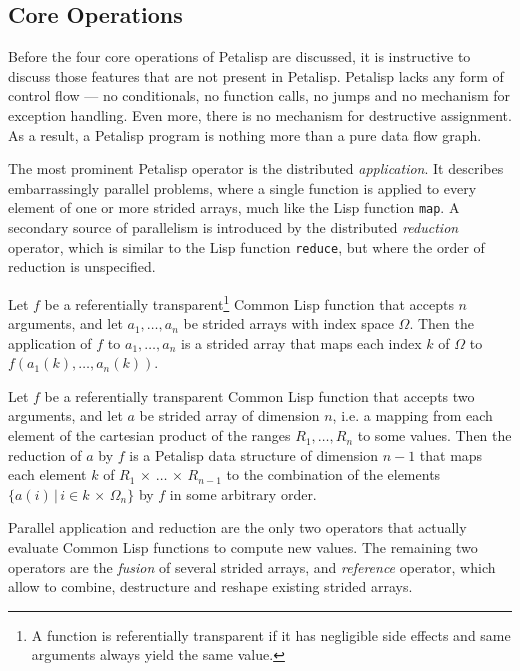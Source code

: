 \subsection{Core Operations}

Before the four core operations of Petalisp are discussed, it is
instructive to discuss those features that are not present in
Petalisp. Petalisp lacks any form of control flow --- no conditionals, no
function calls, no jumps and no mechanism for exception handling. Even
more, there is no mechanism for destructive assignment. As a result, a
Petalisp program is nothing more than a pure data flow graph.

The most prominent Petalisp operator is the distributed
\emph{application}. It describes embarrassingly parallel problems, where a
single function is applied to every element of one or more strided arrays,
much like the Lisp function \texttt{map}. A secondary source of parallelism
is introduced by the distributed \emph{reduction} operator, which is
similar to the Lisp function \texttt{reduce}, but where the order of
reduction is unspecified.

\begin{define}[application]
  Let $f$ be a referentially transparent\footnote{A function is
    referentially transparent if it has negligible side effects and same
    arguments always yield the same value.} Common Lisp function that
  accepts $n$ arguments, and let $a_{1}, \ldots, a_{n}$ be strided arrays
  with index space $\Omega$. Then the application of $f$ to
  $a_{1}, \ldots, a_{n}$ is a strided array that maps each index $k$ of
  $\Omega$ to $f( a_{1}(k), \ldots, a_{n}(k) )$.
\end{define}

\begin{define}[reduction]
  \label{def:reduction}
  Let $f$ be a referentially transparent Common Lisp function that accepts
  two arguments, and let $a$ be strided array of dimension $n$, i.e. a
  mapping from each element of the cartesian product of the ranges
  $R_{1}, \ldots, R_{n}$ to some values. Then the reduction of $a$ by $f$
  is a Petalisp data structure of dimension $n-1$ that maps each element
  $k$ of $R_{1} \,\times\, \ldots \, \times \, R_{n-1}$ to the combination of the
  elements $\{ a(i) \,|\, i \in k \,\times\, \Omega_{n} \}$ by $f$ in some
  arbitrary order.
\end{define}

Parallel application and reduction are the only two operators that actually
evaluate Common Lisp functions to compute new values. The remaining two
operators are the \emph{fusion} of several strided arrays, and
\emph{reference} operator, which allow to combine, destructure and reshape
existing strided arrays.


